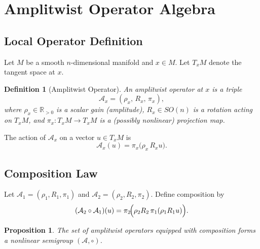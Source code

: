 \documentclass[12pt, a4paper]{article}
\newtheorem{definition}[theorem]{Definition}
\newtheorem{proposition}[theorem]{Proposition}
\theoremstyle{remark}
\theoremstyle{definition}
\begin{document}
\clearpage
\appendix


\section{Amplitwist Operator Algebra}
\label{app:algebra}

\subsection{Local Operator Definition}

Let $M$ be a smooth $n$-dimensional manifold and $x \in M$.  Let $T_x M$ denote the tangent
space at $x$.

\begin{definition}[Amplitwist Operator]
An \emph{amplitwist operator} at $x$ is a triple
\[
\mathcal{A}_x = (\rho_x,\, R_x,\, \pi_x),
\]
where $\rho_x \in \mathbb{R}_{>0}$ is a scalar gain (amplitude), $R_x \in SO(n)$ is a
rotation acting on $T_x M$, and $\pi_x \colon T_x M \to T_x M$ is a (possibly nonlinear)
projection map.
\end{definition}

The action of $\mathcal{A}_x$ on a vector $u \in T_x M$ is
\[
\mathcal{A}_x(u) = \pi_x\!\bigl(\rho_x\, R_x u\bigr).
\]

\subsection{Composition Law}

Let $\mathcal{A}_1 = (\rho_1, R_1, \pi_1)$ and $\mathcal{A}_2 = (\rho_2, R_2, \pi_2)$.
Define composition by
\[
(\mathcal{A}_2 \circ \mathcal{A}_1)(u)
= \pi_2\!\Bigl(\rho_2 R_2\,\pi_1(\rho_1 R_1 u)\Bigr).
\]

\begin{proposition}
The set of amplitwist operators equipped with composition forms a nonlinear semigroup
$(\mathcal{A}, \circ)$.
\end{proposition}
\end{document}
